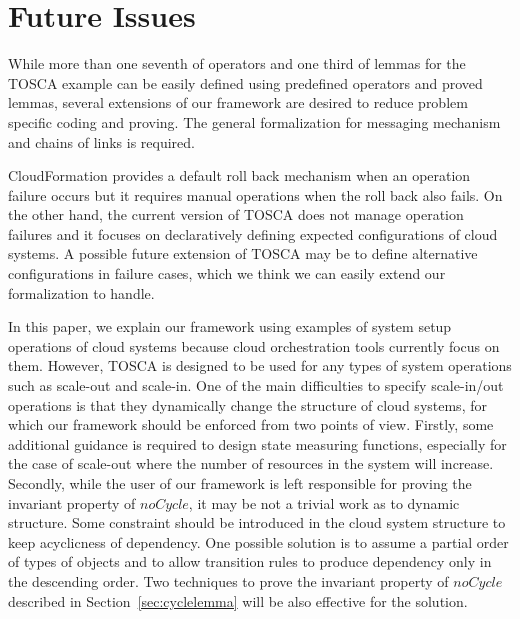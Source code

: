 \documentclass[12pt]{report}
\begin{document}
\section{Future Issues}
While more than one seventh of operators and one third of lemmas for
the TOSCA example can be easily defined using predefined operators and
proved lemmas, several extensions of our framework are desired to
reduce problem specific coding and proving. The general formalization
for messaging mechanism and chains of links is required.

CloudFormation provides a default roll back mechanism when an
operation failure occurs but it requires manual operations when the
roll back also fails. On the other hand, the current version of TOSCA
does not manage operation failures and it focuses on declaratively
defining expected configurations of cloud systems. A possible
future extension of TOSCA may be to define alternative configurations
in failure cases, which we think we can easily extend our
formalization to handle.

In this paper, we explain our framework using examples of system setup
operations of cloud systems because cloud orchestration tools
currently focus on them. However, TOSCA is designed to be used for any
types of system operations such as scale-out and scale-in. One of the
main difficulties to specify scale-in/out operations is that they
dynamically change the structure of cloud systems, for which our
framework should be enforced from two points of view. Firstly, some
additional guidance is required to design state measuring functions,
especially for the case of scale-out where the number of resources in
the system will increase. Secondly, while the user of our framework is
left responsible for proving the invariant property of $noCycle$, it
may be not a trivial work as to dynamic structure. Some constraint
should be introduced in the cloud system structure to keep acyclicness
of dependency. One possible solution is to assume a partial order of
types of objects and to allow transition rules to produce dependency
only in the descending order. Two techniques to prove the invariant
property of $noCycle$ described in Section~\ref{sec:cyclelemma} will
be also effective for the solution.

\end{document}
